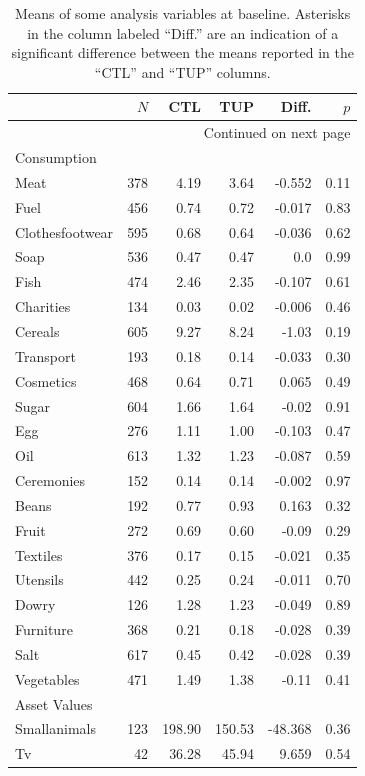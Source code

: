 \documentclass[11pt]{article}
\begin{document}
\begin{longtable}{lrrrrr}
\caption{\label{tab:summary_statistics}Means of some analysis variables at baseline.  Asterisks in the column labeled ``Diff.'' are an indication of a significant difference between the means reported in the ``CTL'' and ``TUP'' columns.}
\\
 & $N$ & CTL & TUP & Diff. & $p$\\
\hline
\endhead
\hline\multicolumn{6}{r}{Continued on next page} \\
\endfoot
\endlastfoot
Consumption &  &  &  &  & \\
\hline
Meat & 378 & 4.19 & 3.64 & -0.552 & 0.11\\
Fuel & 456 & 0.74 & 0.72 & -0.017 & 0.83\\
Clothesfootwear & 595 & 0.68 & 0.64 & -0.036 & 0.62\\
Soap & 536 & 0.47 & 0.47 & 0.0 & 0.99\\
Fish & 474 & 2.46 & 2.35 & -0.107 & 0.61\\
Charities & 134 & 0.03 & 0.02 & -0.006 & 0.46\\
Cereals & 605 & 9.27 & 8.24 & -1.03 & 0.19\\
Transport & 193 & 0.18 & 0.14 & -0.033 & 0.30\\
Cosmetics & 468 & 0.64 & 0.71 & 0.065 & 0.49\\
Sugar & 604 & 1.66 & 1.64 & -0.02 & 0.91\\
Egg & 276 & 1.11 & 1.00 & -0.103 & 0.47\\
Oil & 613 & 1.32 & 1.23 & -0.087 & 0.59\\
Ceremonies & 152 & 0.14 & 0.14 & -0.002 & 0.97\\
Beans & 192 & 0.77 & 0.93 & 0.163 & 0.32\\
Fruit & 272 & 0.69 & 0.60 & -0.09 & 0.29\\
Textiles & 376 & 0.17 & 0.15 & -0.021 & 0.35\\
Utensils & 442 & 0.25 & 0.24 & -0.011 & 0.70\\
Dowry & 126 & 1.28 & 1.23 & -0.049 & 0.89\\
Furniture & 368 & 0.21 & 0.18 & -0.028 & 0.39\\
Salt & 617 & 0.45 & 0.42 & -0.028 & 0.39\\
Vegetables & 471 & 1.49 & 1.38 & -0.11 & 0.41\\
\hline
Asset Values &  &  &  &  & \\
\hline
Smallanimals & 123 & 198.90 & 150.53 & -48.368 & 0.36\\
Tv & 42 & 36.28 & 45.94 & 9.659 & 0.54\\

\end{longtable}
\end{document}
